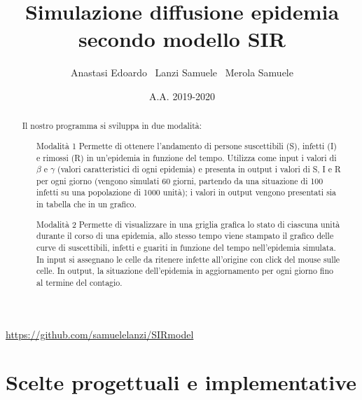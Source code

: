 \documentclass[a4paper,10 pt]{article}
\title{\huge{Simulazione diffusione epidemia secondo modello SIR}}
\author{Anastasi Edoardo \  Lanzi Samuele \ Merola Samuele}
\date{A.A. 2019-2020}
\begin{document}
\maketitle 

\begin{center}
  \url{https://github.com/samuelelanzi/SIRmodel}
\end{center}

\begin{abstract}
 Il nostro programma si sviluppa in due modalità:
 \begin{itemize}
    \item[Modalità 1] Permette di ottenere l'andamento di persone suscettibili (S), infetti (I) e rimossi (R) in un'epidemia in funzione del tempo. 
    Utilizza come input i valori di $\beta$ e $\gamma$ (valori caratteristici di ogni epidemia) e presenta in output i valori di S, I e R per ogni giorno 
    (vengono simulati 60 giorni, partendo da una situazione di 100 infetti su una popolazione di 1000 unità); 
    i valori in output vengono presentati sia in tabella che in un grafico.

    \item[Modalità 2] Permette di visualizzare in una griglia grafica lo stato di ciascuna unità durante il corso di una epidemia, 
    allo stesso tempo viene stampato il grafico delle curve di suscettibili, infetti e guariti in funzione del tempo nell'epidemia simulata. 
    In input si assegnano le celle da ritenere infette all'origine con click del mouse sulle celle.
    In output, la situazione dell'epidemia in aggiornamento per ogni giorno fino al termine del contagio.
  \end{itemize}
\end{abstract}



\section{Scelte progettuali e implementative} 
\end{document}
